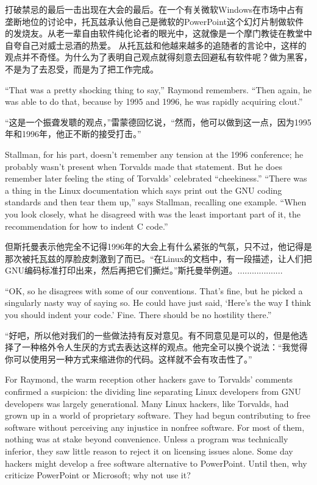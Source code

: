 \ifdefined\chs
打破禁忌的最后一击出现在大会的最后。在一个有关微软Windows在市场中占有垄断地位的讨论中，托瓦兹承认他自己是微软的PowerPoint这个幻灯片制做软件的发烧友。从老一辈自由软件纯化论者的眼光中，这就像是一个摩门教徒在教堂中自夸自己对威士忌酒的热爱。 从托瓦兹和他越来越多的追随者的言论中，这样的观点并不奇怪。为什么为了表明自己观点就得刻意去回避私有软件呢？做为黑客，不是为了去忍受，而是为了把工作完成。
\fi

\ifdefined\eng
``That was a pretty shocking thing to say,'' Raymond remembers. ``Then again, he was able to do that, because by 1995 and 1996, he was rapidly acquiring clout.''
\fi

\ifdefined\chs
``这是一个振聋发聩的观点，''雷蒙德回忆说，``然而，他可以做到这一点，因为1995年和1996年，他正不断的接受打击。''
\fi

\ifdefined\eng
Stallman, for his part, doesn't remember any tension at the 1996 conference; he probably wasn't present when Torvalds made that statement.  But he does remember later feeling the sting of Torvalds' celebrated ``cheekiness.'' ``There was a thing in the Linux documentation which says print out the GNU coding standards and then tear them up,'' says Stallman, recalling one example. ``When you look closely, what he disagreed with was the least important part of it, the recommendation for how to indent C code.''
\fi

\ifdefined\chs
但斯托曼表示他完全不记得1996年的大会上有什么紧张的气氛，只不过，他记得是那次被托瓦兹的厚脸皮刺激到了而已。``在Linux的文档中，有一段描述，让人们把GNU编码标准打印出来，然后再把它们撕烂。''斯托曼举例道。...................
\fi

\ifdefined\eng
``OK, so he disagrees with some of our conventions. That's fine, but he picked a singularly nasty way of saying so. He could have just said, `Here's the way I think you should indent your code.' Fine. There should be no hostility there.''
\fi

\ifdefined\chs
``好吧，所以他对我们的一些做法持有反对意见。有不同意见是可以的，但是他选择了一种格外令人生厌的方式去表达这样的观点。他完全可以换个说法：``我觉得你可以使用另一种方式来缩进你的代码。这样就不会有攻击性了。''
\fi

\ifdefined\eng
For Raymond, the warm reception other hackers gave to Torvalds' comments confirmed a suspicion: the dividing line separating Linux developers from GNU developers was largely generational. Many Linux hackers, like Torvalds, had grown up in a world of proprietary software. They had begun contributing to free software without perceiving any injustice in nonfree software.  For most of them, nothing was at stake beyond convenience.  Unless a program was technically inferior, they saw little reason to reject it on licensing issues alone. Some day hackers might develop a free software alternative to PowerPoint. Until then, why criticize PowerPoint or Microsoft; why not use it?
\fi

